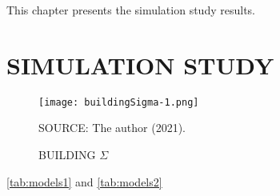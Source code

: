 This chapter presents the simulation study results.

\section{SIMULATION STUDY}
\label{cap:simures}

\begin{figure}[H]
 \setlength{\abovecaptionskip}{.0001pt}
 \caption{BUILDING \(\Sigma\)}
 \vspace{0.2cm}\centering
 \texttt{[image: buildingSigma-1.png]}\\
 \begin{footnotesize}
  SOURCE: The author (2021).
 \end{footnotesize}
 \label{fig:buildingSigma}
\end{figure}

\autoref{tab:models1} and \autoref{tab:models2}

